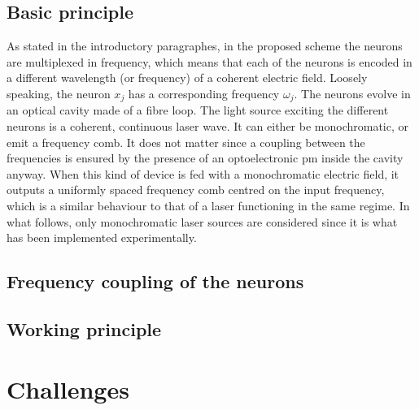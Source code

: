 
\subsection{Basic principle}

As stated in the introductory paragraphes, in the proposed scheme the neurons are multiplexed in frequency, which means that each of the neurons is encoded in a different wavelength (or frequency) of a coherent electric field. Loosely speaking, the neuron $x_j$ has a corresponding frequency $\omega_j$. The neurons evolve in an optical cavity made of a fibre loop. The light source exciting the different neurons is a coherent, continuous laser wave. It can either be monochromatic, or emit a frequency comb. It does not matter since a coupling between the frequencies is ensured by the presence of an optoelectronic \gls{pm} inside the cavity anyway. When this kind of device is fed with a monochromatic electric field, it outputs a uniformly spaced frequency comb centred on the input frequency, which is a similar behaviour to that of a laser functioning in the same regime. In what follows, only monochromatic laser sources are considered since it is what has been implemented experimentally.


\subsection{Frequency coupling of the neurons}

\label{subsec-freq-coupling}


\subsection{Working principle}


\section{Challenges}

\label{sec-challenges-wdm}